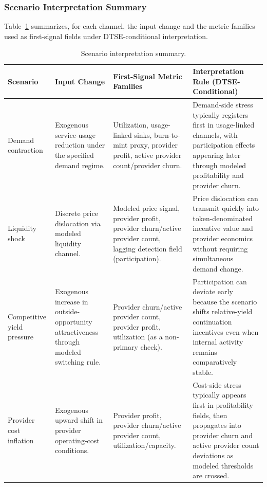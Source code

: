 \subsubsection{Scenario Interpretation Summary}
Table~\ref{tab:dtse_scenario_interpretation_cards} summarizes, for each channel, the input change and the metric families used as first-signal fields under DTSE-conditional interpretation.
\begin{table}[ht]
    \centering
    \footnotesize
    \setlength{\tabcolsep}{3pt}
    \renewcommand{\arraystretch}{1.2}
    \begin{tabularx}{\textwidth}{@{}
      >{\raggedright\arraybackslash}p{}
      >{\raggedright\arraybackslash}p{}
      >{\raggedright\arraybackslash}p{}
      >{\raggedright\arraybackslash}X
    @{}}
    \toprule
    \textbf{Scenario} & \textbf{Input Change} & \textbf{First-Signal Metric Families} & \textbf{Interpretation Rule (DTSE-Conditional)} \\
    \midrule
    Demand contraction & Exogenous service-usage reduction under the specified demand regime. & Utilization, usage-linked sinks, burn-to-mint proxy, provider profit, active provider count/provider churn. & Demand-side stress typically registers first in usage-linked channels, with participation effects appearing later through modeled profitability and provider churn. \\
    \addlinespace
    Liquidity shock & Discrete price dislocation via modeled liquidity channel. & Modeled price signal, provider profit, provider churn/active provider count, lagging detection field (participation). & Price dislocation can transmit quickly into token-denominated incentive value and provider economics without requiring simultaneous demand change. \\
    \addlinespace
    Competitive yield pressure & Exogenous increase in outside-opportunity attractiveness through modeled switching rule. & Provider churn/active provider count, provider profit, utilization (as a non-primary check). & Participation can deviate early because the scenario shifts relative-yield continuation incentives even when internal activity remains comparatively stable. \\
    \addlinespace
    Provider cost inflation & Exogenous upward shift in provider operating-cost conditions. & Provider profit, provider churn/active provider count, utilization/capacity. & Cost-side stress typically appears first in profitability fields, then propagates into provider churn and active provider count deviations as modeled thresholds are crossed. \\
    \bottomrule
    \end{tabularx}
    \caption{Scenario interpretation summary.}
    \label{tab:dtse_scenario_interpretation_cards}
\end{table}

